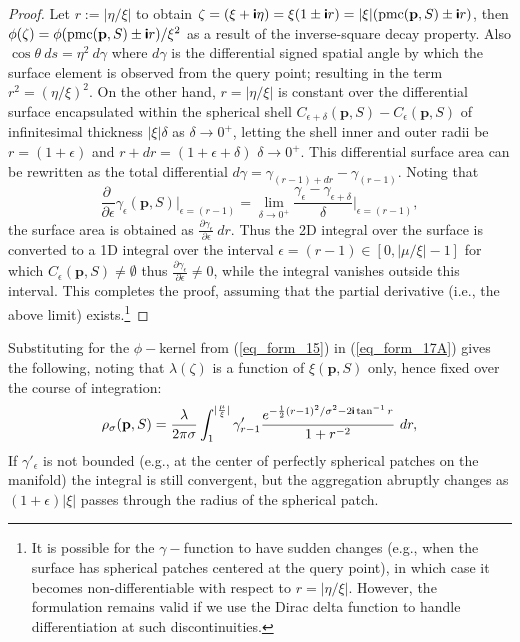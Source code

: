 \documentclass[article]{gmp2014}
\theoremstyle{definition}
\newcommand{\ii}{\text{\textsf{\textbf{i}}}}
\begin{document}
\begin{proof}
    Let $r := |\eta/\xi|$ to obtain $\zeta = (\xi + \ii \eta) = \xi(1 \pm \ii r) = |\xi|(\mathrm{pmc}(\mathbf{p}, S) \pm \ii r)$, then $\phi(\zeta) = \phi(\mathrm{pmc}(\mathbf{p}, S) \pm \ii r) / \xi^2$ as a result of the inverse-square decay property. Also $\cos \theta~ds = \eta^2~d\gamma$ where $d\gamma$ is the differential signed spatial angle by which the surface element is observed from the query point; resulting in the term $r^2 = (\eta/\xi)^2$.
    On the other hand, $r = |\eta/\xi|$ is constant over the differential surface encapsulated within the spherical shell $C_{\epsilon + \delta} (\mathbf{p}, S) - C_{\epsilon}(\mathbf{p}, S)$ of infinitesimal thickness $|\xi|\delta$ as $\delta \to 0^+$, letting the shell inner and outer radii be $r = (1 + \epsilon)$ and $r + dr = (1 + \epsilon + \delta)$ $\delta \to 0^+$. This differential surface area can be rewritten as the total differential $d\gamma = \gamma_{(r - 1) + dr} - \gamma_{(r - 1)}$. Noting that
    \begin{equation}
        \frac{\partial ~}{ \partial \epsilon} \gamma_\epsilon(\mathbf{p}, S) \big|_{\epsilon = (r - 1)} = \lim_{\delta \to 0^+} \frac{\gamma_{\epsilon} - \gamma_{\epsilon + \delta}}{\delta} \big|_{\epsilon = (r - 1)},
    \end{equation}
    the surface area is obtained as $\frac{\partial \gamma_\epsilon}{ \partial \epsilon} ~dr$. Thus the 2D integral over the surface is converted to a 1D integral over the interval $\epsilon = (r-1) \in [0, |\mu/\xi|-1]$ for which $C_\epsilon(\mathbf{p}, S) \neq \emptyset$ thus $\frac{\partial \gamma_\epsilon}{\partial \epsilon} \neq 0$, while the integral vanishes outside this interval. This completes the proof, assuming that the partial derivative (i.e., the above limit) exists.\footnote{It is possible for the $\gamma-$function to have sudden changes (e.g., when the surface has spherical patches centered at the query point), in which case it becomes non-differentiable with respect to $r = |\eta/\xi|$. However, the formulation remains valid if we use the Dirac delta function to handle differentiation at such discontinuities.}
\end{proof}
%
Substituting for the $\phi-$kernel from (\ref{eq_form_15}) in (\ref{eq_form_17A}) gives the following, noting that $\lambda(\zeta)$ is a function of $\xi(\mathbf{p}, S)$ only, hence fixed over the course of integration:
%
\begin{equation}
    \rho_\sigma(\mathbf{p}, S) = \frac{\lambda}{2\pi\sigma} \int_1^{|\frac{\mu}{\xi}|} \gamma_{r-1}' \frac{e^{-\frac{1}{2}(r - 1)^2/\sigma^2 - 2 \ii \tan^{-1}r}}{1 + r^{-2}}~ dr, \label{eq_form_17B}
\end{equation}
%
If $\gamma'_\epsilon$ is not bounded (e.g., at the center of perfectly spherical patches on the manifold) the integral is still convergent, but the aggregation abruptly changes as $(1+\epsilon)|\xi|$ passes through the radius of the spherical patch.
\end{document}
